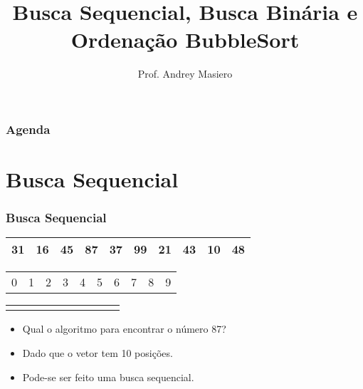 \documentclass{beamer}
\begin{document}
\title[Buscas e BubbleSort]{Busca Sequencial, Busca Binária e Ordenação BubbleSort}
\author{Prof. Andrey Masiero}

\begin{frame}
  \titlepage
\end{frame}

\begin{frame}
  \frametitle{Agenda}
  \tableofcontents
\end{frame}

\section{Busca Sequencial}

\begin{frame}
    \frametitle{Busca Sequencial}
    \begin{center}
        \begin{table}
            \begin{tabular}{| p{0.25cm} | p{0.25cm} | p{0.25cm} | p{0.25cm} | p{0.25cm} | p{0.25cm} | p{0.25cm} | p{0.25cm} | p{0.25cm} | p{0.25cm} |}
                \hline
                31 & 16 & 45 & 87 & 37 & 99 & 21 & 43 & 10 & 48 \\ \hline
            \end{tabular}
            \begin{tabular}{p{0.25cm} p{0.25cm} p{0.25cm} p{0.25cm} p{0.25cm} p{0.25cm} p{0.25cm} p{0.25cm} p{0.25cm} p{0.25cm}}
                0 & 1 & 2 & 3 & 4 & 5 & 6 & 7 & 8 & 9
            \end{tabular}
            \begin{tabular}{p{0.25cm} p{0.25cm} p{0.25cm} p{0.25cm} p{0.25cm} p{0.25cm} p{0.25cm} p{0.25cm} p{0.25cm} p{0.25cm}}
                & & & & & & & & &
            \end{tabular}
        \end{table}
	\end{center}
    \begin{itemize}[<+->]
        \item Qual o algoritmo para encontrar o número 87?
        \item Dado que o vetor tem 10 posições.
        \item Pode-se ser feito uma busca sequencial.
    \end{itemize}
\end{frame}
\end{document}
